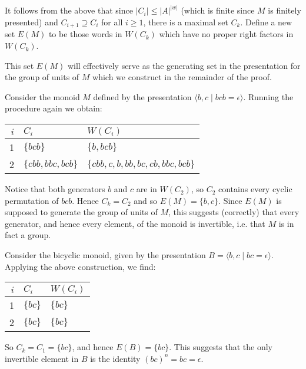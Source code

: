 \documentclass[noindex,noinsetproof,12pt]{lmaths}
\begin{document}
It follows from the above that since $|C_i| \le |A|^{|w|}$ (which is finite since $M$ is finitely presented) and $C_{i+1} \supseteq C_i$ for all $i \ge 1$, there is a maximal set $C_k$. Define a new set $E(M)$ to be those words in $W(C_k)$ which have no proper right factors in $W(C_k)$.

This set $E(M)$ will effectively serve as the generating set in the presentation for the group of units of $M$ which we construct in the remainder of the proof.

\begin{example} \label{ex:Ck-group}
	Consider the monoid $M$ defined by the presentation $\langle b, c \mid bcb = \epsilon \rangle$. Running the procedure again we obtain:

	\begin{center}
	\renewcommand{\arraystretch}{1.2}
	\begin{tabular}{r|ll}
		$i$ & $C_i$ & $W(C_i)$ \\ \hline
		1 & $\{bcb\}$ & $\{b, bcb\}$ \\
		2 & $\{cbb, bbc, bcb\}$ & $\{cbb, c, b, bb, bc, cb, bbc, bcb\}$
	\end{tabular}
	\end{center}

	Notice that both generators $b$ and $c$ are in $W(C_2)$, so $C_2$ contains every cyclic permutation of $bcb$. Hence $C_k = C_2$ and so $E(M) = \{ b, c\}$. Since $E(M)$ is supposed to generate the group of units of $M$, this suggests (correctly) that every generator, and hence every element, of the monoid is invertible, i.e. that $M$ is in fact a group. 
\end{example}

\begin{example}
	Consider the bicyclic monoid, given by the presentation $B = \langle b, c \mid bc = \epsilon \rangle$.
	Applying the above construction, we find:

	\begin{center}
	\renewcommand{\arraystretch}{1.2}
	\begin{tabular}{r|ll}
		$i$ & $C_i$ & $W(C_i)$ \\ \hline
		1 & $\{bc\}$ & $\{bc\}$ \\
		2 & $\{bc\}$ & $\{bc\}$
	\end{tabular}
	\end{center}

	So $C_k = C_1 = \{ bc \}$, and hence $E(B) = \{bc\}$. This suggests that the only invertible element in $B$ is the identity $(bc)^n = bc = \epsilon$.
\end{example}
\end{document}
